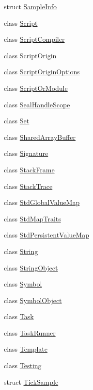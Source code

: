 \begin{DoxyCompactItemize}
struct \mbox{\hyperlink{structv8_1_1SampleInfo}{Sample\+Info}}
\item 
class \mbox{\hyperlink{classv8_1_1Script}{Script}}
\item 
class \mbox{\hyperlink{classv8_1_1ScriptCompiler}{Script\+Compiler}}
\item 
class \mbox{\hyperlink{classv8_1_1ScriptOrigin}{Script\+Origin}}
\item 
class \mbox{\hyperlink{classv8_1_1ScriptOriginOptions}{Script\+Origin\+Options}}
\item 
class \mbox{\hyperlink{classv8_1_1ScriptOrModule}{Script\+Or\+Module}}
\item 
class \mbox{\hyperlink{classv8_1_1SealHandleScope}{Seal\+Handle\+Scope}}
\item 
class \mbox{\hyperlink{classv8_1_1Set}{Set}}
\item 
class \mbox{\hyperlink{classv8_1_1SharedArrayBuffer}{Shared\+Array\+Buffer}}
\item 
class \mbox{\hyperlink{classv8_1_1Signature}{Signature}}
\item 
class \mbox{\hyperlink{classv8_1_1StackFrame}{Stack\+Frame}}
\item 
class \mbox{\hyperlink{classv8_1_1StackTrace}{Stack\+Trace}}
\item 
class \mbox{\hyperlink{classv8_1_1StdGlobalValueMap}{Std\+Global\+Value\+Map}}
\item 
class \mbox{\hyperlink{classv8_1_1StdMapTraits}{Std\+Map\+Traits}}
\item 
class \mbox{\hyperlink{classv8_1_1StdPersistentValueMap}{Std\+Persistent\+Value\+Map}}
\item 
class \mbox{\hyperlink{classv8_1_1String}{String}}
\item 
class \mbox{\hyperlink{classv8_1_1StringObject}{String\+Object}}
\item 
class \mbox{\hyperlink{classv8_1_1Symbol}{Symbol}}
\item 
class \mbox{\hyperlink{classv8_1_1SymbolObject}{Symbol\+Object}}
\item 
class \mbox{\hyperlink{classv8_1_1Task}{Task}}
\item 
class \mbox{\hyperlink{classv8_1_1TaskRunner}{Task\+Runner}}
\item 
class \mbox{\hyperlink{classv8_1_1Template}{Template}}
\item 
class \mbox{\hyperlink{classv8_1_1Testing}{Testing}}
\item 
struct \mbox{\hyperlink{structv8_1_1TickSample}{Tick\+Sample}}
\item 

\end{DoxyCompactItemize}
